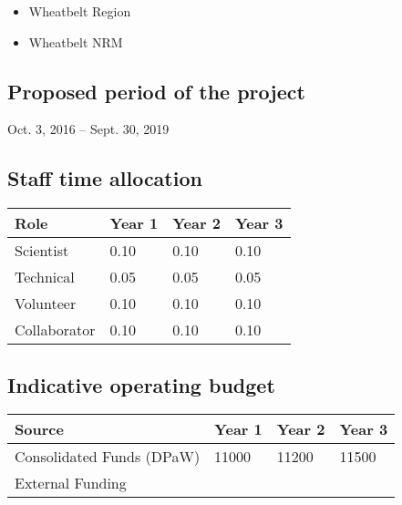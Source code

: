 \documentclass[version=last,
    paper=a4, %
    10pt, %
    usenames,
    dvipsnames,
    oneside, %
    headings=openany, %
    DIV=15 %
]{scrbook}
\begin{document}
\begin{itemize}
\itemsep1pt\parskip0pt
\item
  Wheatbelt Region
\item
  Wheatbelt NRM
\end{itemize}


\subsection*{Proposed period of the project}
Oct. 3, 2016 -- Sept. 30, 2019



\subsection*{Staff time allocation }



\begin{longtabu} to \linewidth { |  X | X | X | X | }
\hline
{}
Role & Year 1 & Year 2 & Year 3\\
\hline
\endhead



Scientist & 0.10 & 0.10 & 0.10\\



Technical & 0.05 & 0.05 & 0.05\\



Volunteer & 0.10 & 0.10 & 0.10\\



Collaborator & 0.10 & 0.10 & 0.10\\


\hline
\end{longtabu}



\subsection*{Indicative operating budget }



\begin{longtabu} to \linewidth { |  X | X | X | X | }
\hline
{}
Source & Year 1 & Year 2 & Year 3\\
\hline
\endhead



Consolidated Funds (DPaW) & 11000 & 11200 & 11500\\



External Funding &  &  & \\


\hline
\end{longtabu}






\end{document}
